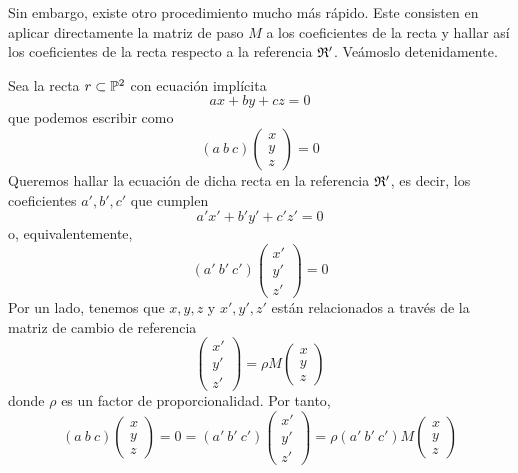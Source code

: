 Sin embargo, existe otro procedimiento mucho más rápido. Este consisten en aplicar directamente la matriz de paso $M$ a los coeficientes de la recta y hallar así los coeficientes de la recta respecto a la referencia $\mathfrak{R}'$. Veámoslo detenidamente.

Sea la recta $r\subset\mathbb{P}^2$ con ecuación implícita
\begin{equation*}
	ax+by+cz=0
\end{equation*}
que podemos escribir como
\begin{equation*}
(a \ b \ c)\left( \begin{array}{c}
x\\
y\\
z
\end{array}\right) =0
\end{equation*}
Queremos hallar la ecuación de dicha recta en la referencia $\mathfrak{R}'$, es decir, los coeficientes $a',b',c'$ que cumplen
\begin{equation*}
	a'x'+b'y'+c'z'=0
\end{equation*}
o, equivalentemente,
\begin{equation*}
	(a' \ b' \ c')\left( \begin{array}{c}
		x'\\
		y'\\
		z'
	\end{array}\right) =0
\end{equation*}
Por un lado, tenemos que $x,y,z$ y $x',y',z'$ están relacionados a través de la matriz de cambio de referencia
\begin{equation*}
	\left( \begin{array}{c}
	x'\\
	y'\\
	z'
	\end{array}\right)=\rho M 
	\left( \begin{array}{c}
		x\\
		y\\
		z
	\end{array}\right)
\end{equation*}
donde $\rho$ es un factor de proporcionalidad. Por tanto, 
\begin{equation*}
	(a \ b \ c)\left( \begin{array}{c}
		x\\
		y\\
		z
	\end{array}\right) =0=(a' \ b' \ c')\left( \begin{array}{c}
		x'\\
		y'\\
		z'
	\end{array}\right)=\rho(a' \ b' \ c')M 
	\left( \begin{array}{c}
		x\\
		y\\
		z
	\end{array}\right)
\end{equation*}
